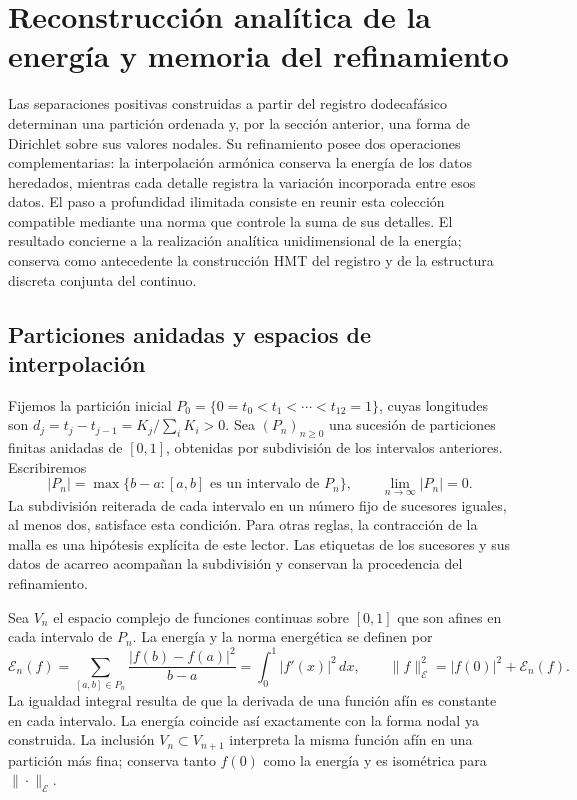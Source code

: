 \section{Reconstrucción analítica de la energía y memoria del refinamiento}
\label{sec:limite-energetico-k}

Las separaciones positivas construidas a partir del registro dodecafásico
determinan una partición ordenada y, por la sección anterior, una forma
de Dirichlet sobre sus valores nodales. Su refinamiento posee dos
operaciones complementarias: la interpolación armónica conserva la energía
de los datos heredados, mientras cada detalle registra la variación
incorporada entre esos datos. El paso a profundidad ilimitada consiste en
reunir esta colección compatible mediante una norma que controle la suma de
sus detalles. El resultado concierne a la realización analítica
unidimensional de la energía; conserva como antecedente la construcción
HMT del registro y de la estructura discreta conjunta del continuo.

\subsection{Particiones anidadas y espacios de interpolación}

Fijemos la partición inicial
\(P_0=\{0=t_0<t_1<\cdots<t_{12}=1\}\), cuyas longitudes son
\(d_j=t_j-t_{j-1}=K_j/\sum_iK_i>0\). Sea
\((P_n)_{n\geq0}\) una sucesión de particiones finitas anidadas de
\([0,1]\), obtenidas por subdivisión de los intervalos anteriores.
Escribiremos
\[
 |P_n|=\max\{b-a:[a,b]\text{ es un intervalo de }P_n\},
 \qquad \lim_{n\to\infty}|P_n|=0.
\]
La subdivisión reiterada de cada intervalo en un número fijo de sucesores
iguales, al menos dos, satisface esta condición. Para otras reglas, la
contracción de la malla es una hipótesis explícita de este lector.
Las etiquetas de los sucesores y sus datos de acarreo acompañan la
subdivisión y conservan la procedencia del refinamiento.

Sea \(V_n\) el espacio complejo de funciones continuas sobre \([0,1]\)
que son afines en cada intervalo de \(P_n\). La energía y la norma
energética se definen por
\begin{equation}
 \mathcal E_n(f)
 =\sum_{[a,b]\in P_n}\frac{|f(b)-f(a)|^2}{b-a}
 =\int_0^1|f'(x)|^2\,dx,
 \qquad
 \|f\|_{\mathcal E}^2=|f(0)|^2+\mathcal E_n(f).
 \label{eq:energia-afines-k}
\end{equation}
La igualdad integral resulta de que la derivada de una función afín es
constante en cada intervalo. La energía coincide así exactamente con
la forma nodal ya construida. La inclusión \(V_n\subset V_{n+1}\)
interpreta la misma función afín en una partición más fina; conserva
tanto \(f(0)\) como la energía y es isométrica para
\(\|\cdot\|_{\mathcal E}\).

